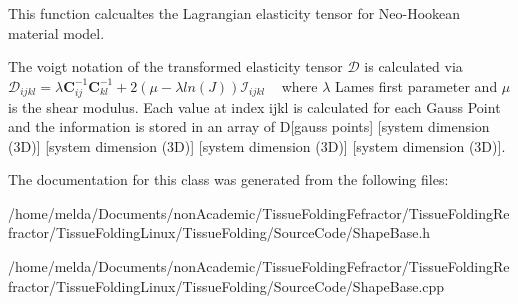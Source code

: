 This function calcualtes the Lagrangian elasticity tensor for Neo-\/\+Hookean material model. 

The voigt notation of the transformed elasticity tensor $ \mathcal D $ is calculated via $ \mathcal{D}_{ijkl} = \lambda \boldsymbol{C}^{-1}_{ij} \boldsymbol{C}^{-1}_{kl} + 2 \left( \mu - \lambda ln(J)\right) \mathcal{I}_{ijkl} $ ~\newline
where $ \lambda $ Lame\textquotesingle{}s first parameter and $ \mu $ is the shear modulus. Each value at index ijkl is calculated for each Gauss Point and the information is stored in an array of D\mbox{[}gauss points\mbox{]} \mbox{[}system dimension (3\+D)\mbox{]} \mbox{[}system dimension (3\+D)\mbox{]} \mbox{[}system dimension (3\+D)\mbox{]} \mbox{[}system dimension (3\+D)\mbox{]}.

The documentation for this class was generated from the following files\+:\begin{DoxyCompactItemize}
\item 
/home/melda/\+Documents/non\+Academic/\+Tissue\+Folding\+Fefractor/\+Tissue\+Folding\+Refractor/\+Tissue\+Folding\+Linux/\+Tissue\+Folding/\+Source\+Code/Shape\+Base.\+h\item 
/home/melda/\+Documents/non\+Academic/\+Tissue\+Folding\+Fefractor/\+Tissue\+Folding\+Refractor/\+Tissue\+Folding\+Linux/\+Tissue\+Folding/\+Source\+Code/Shape\+Base.\+cpp\end{DoxyCompactItemize}
